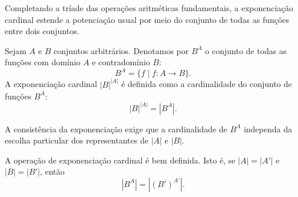 Completando a tríade das operações aritméticas fundamentais, a exponenciação cardinal estende a potenciação usual por meio do conjunto de todas as funções entre dois conjuntos.

\begin{definicao}
    \label{def:exponenciacao_cardinal}
    Sejam \(A\) e \(B\) conjuntos arbitrários. Denotamos por \(B^A\) o conjunto de todas as funções com domínio \(A\) e contradomínio \(B\):
    \[
        B^A = \{f \mid f: A \to B\}.
    \]
    A exponenciação cardinal \(|B|^{|A|}\) é definida como a cardinalidade do conjunto de funções \(B^A\):
    \[
        |B|^{|A|} = |B^A|.
    \]
\end{definicao}

A consistência da exponenciação exige que a cardinalidade de \(B^A\) independa da escolha particular dos representantes de \(|A|\) e \(|B|\).

\begin{lema}
    \label{lem:exponenciacao_cardinal_bem_definida}
    A operação de exponenciação cardinal é bem definida. Isto é, se \(|A| = |A'|\) e \(|B| = |B'|\), então
    \[
        |B^A| = |(B')^{A'}|.
    \]
\end{lema}

